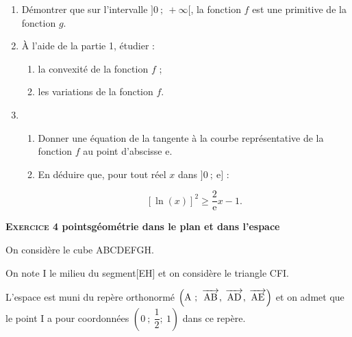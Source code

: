\documentclass[11pt]{article}
\newcommand{\vect}[1]{\overrightarrow{\,\mathstrut#1\,}}
\begin{document}
\begin{enumerate}
\item Démontrer que sur l'intervalle $]0~;~+ \infty[$, la fonction $f$ est une primitive de la fonction $g$.
\item À l'aide de la partie 1, étudier :
	\begin{enumerate}
		\item la convexité de la fonction $f$ ;
		\item les variations de la fonction $f$.
\end{enumerate}
\item 
	\begin{enumerate}
		\item Donner une équation de la tangente à la courbe représentative de la fonction $f$ au point d'abscisse e.
		\item En déduire que, pour tout réel $x$ dans $]0~;~\text{e}]$ :
		
\[[\ln (x)]^2 \geqslant \dfrac{2}{\text{e}}x - 1.\]

	\end{enumerate}
\end{enumerate}
\bigskip

\textbf{\textsc{Exercice 4}  points\hfill géométrie dans le plan et dans l'espace}

\medskip

On considère le cube ABCDEFGH.

On note I le milieu du segment[EH] et on considère le triangle CFI.

L'espace est muni du repère orthonormé $\left(\text{A}~;~ \vect{\text{AB}},\: \vect{\text{AD}},\: \vect{\text{AE}}\right)$ et on admet que le point I a
pour coordonnées $\left(0~;~\dfrac12;~1\right)$ dans ce repère.
\end{document}
